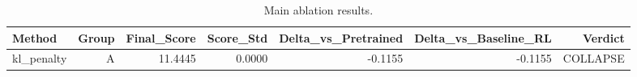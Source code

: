\begin{table}[htbp]
\centering
\caption{Main ablation results.}
\label{tab:main_results}
\begin{tabular}{lrrrrrr}
\toprule
\textbf{Method} & \textbf{Group} & \textbf{Final\_Score} & \textbf{Score\_Std} & \textbf{Delta\_vs\_Pretrained} & \textbf{Delta\_vs\_Baseline\_RL} & \textbf{Verdict} \\
\midrule
kl\_penalty & A & 11.4445 & 0.0000 & -0.1155 & -0.1155 & COLLAPSE \\
\bottomrule
\end{tabular}
\end{table}